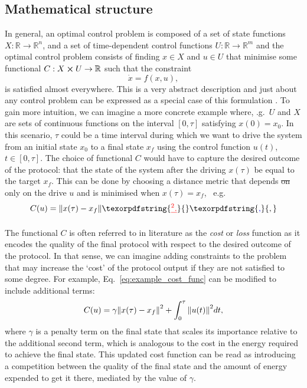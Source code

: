 \documentclass[a4paper,oneside,11pt]{book}
\newcommand{\R}{\mathbb{R}}
\providecommand{\DIFaddtex}[1]{{\protect\color{blue}\uwave{#1}}} %
\providecommand{\DIFdeltex}[1]{{\protect\color{red}\sout{#1}}}                      %
\providecommand{\DIFaddbegin}{} %
\providecommand{\DIFaddend}{} %
\providecommand{\DIFdelbegin}{} %
\providecommand{\DIFdelend}{} %
\providecommand{\DIFadd}[1]{\texorpdfstring{\DIFaddtex{#1}}{#1}} %
\providecommand{\DIFdel}[1]{\texorpdfstring{\DIFdeltex{#1}}{}} %
\newcommand{\DIFscaledelfig}{0.5}
\newlength{\DIFdelgraphicswidth} %
\newlength{\DIFdelgraphicsheight} %
\newcommand{\DIFaddincludegraphics}[2][]{{\color{blue}\fbox{\DIFOincludegraphics[#1]{#2}}}} %
\newcommand{\DIFdelincludegraphics}[2][]{%
\sbox{\DIFdelgraphicsbox}{\DIFOincludegraphics[#1]{#2}}%
\settoboxwidth{\DIFdelgraphicswidth}{\DIFdelgraphicsbox} %
\settoboxtotalheight{\DIFdelgraphicsheight}{\DIFdelgraphicsbox} %
\scalebox{\DIFscaledelfig}{%
\parbox[b]{\DIFdelgraphicswidth}{\usebox{\DIFdelgraphicsbox}\\[-\baselineskip] \rule{\DIFdelgraphicswidth}{0em}}\llap{\resizebox{\DIFdelgraphicswidth}{\DIFdelgraphicsheight}{%
\setlength{\unitlength}{\DIFdelgraphicswidth}%
\begin{picture}(1,1)%
\thicklines\linethickness{2pt} %
{\color[rgb]{1,0,0}\put(0,0){\framebox(1,1){}}}%
{\color[rgb]{1,0,0}\put(0,0){\line( 1,1){1}}}%
{\color[rgb]{1,0,0}\put(0,1){\line(1,-1){1}}}%
\end{picture}%
}\hspace*{3pt}}} %
} %
\DeclareRobustCommand{\DIFaddbegin}{\DIFOaddbegin \let\includegraphics\DIFaddincludegraphics} %
\DeclareRobustCommand{\DIFaddend}{\DIFOaddend \let\includegraphics\DIFOincludegraphics} %
\DeclareRobustCommand{\DIFdelbegin}{\DIFOdelbegin \let\includegraphics\DIFdelincludegraphics} %
\DeclareRobustCommand{\DIFdelend}{\DIFOaddend \let\includegraphics\DIFOincludegraphics} %
\begin{document}
\subsection{Mathematical structure}\label{sec:3.1.1_mathematical_structure}

In general, an optimal control problem is composed of a set of state functions $X: \R \rightarrow \R^n$, and a set of time-dependent control functions $U:\R \rightarrow \R^m$ and the optimal control problem consists of finding $x \in X$ and $u \in U$ that minimise some functional $C: X \cross U \rightarrow \R$ such that the constraint
\begin{equation}\label{eq:control_ODE}
    \dot{x} = f(x, u),
\end{equation}
is satisfied almost everywhere. This is a very abstract description and just about any control problem can be expressed as a special case of this formulation \cite{dalessandro_introduction_2021}. To gain more intuition, we can imagine a more concrete example where, \@e.g.~$U$ and $X$ are sets of continuous functions on the interval $[0, \tau]$ satisfying $x(0) = x_0$. In this scenario, $\tau$ could be a time interval during which we want to drive the system from an initial state $x_0$ to a final state $x_f$ using the control function $u(t)$, $t \in [0, \tau]$. The choice of functional $C$ would have to capture the desired outcome of the protocol: that the state of the system after the driving $x(\tau)$ be equal to the target $x_f$. This can be done by choosing a distance metric that depends \DIFdelbegin \DIFdel{on }\DIFdelend only on the drive $u$ and is minimised when $x(\tau) = x_f$, \@~e.g.
\begin{equation}\label{eq:example_cost_func}
    C(u) = \norm{x(\tau)  - x_f}\DIFdelbegin \DIFdel{^2.
}\DIFdelend \DIFaddbegin \DIFadd{,
}\DIFaddend \end{equation}
\DIFaddbegin \DIFadd{where $\norm{\cdot}$ represents some norm on the space $X$.
}

	\DIFaddend The functional $C$ is often referred to in literature as the \emph{cost} or \emph{loss} function \cite{wald_statistical_1950} as it encodes the quality of the final protocol with respect to the desired outcome of the protocol. In that sense, we can imagine adding constraints to the problem that may increase the `cost' of the protocol output if they are not satisfied to some degree. For example, Eq.~\eqref{eq:example_cost_func} can be modified to include additional terms:
\begin{equation}\label{eq:example_cost_func2}
    C(u) = \gamma \norm{x(\tau)  - x_f}^2 + \int_0^{\tau} \norm{u(t)}^2 dt,
\end{equation}
where $\gamma$ is a penalty term on the final state that scales its importance relative to the additional second term, which is analogous to the cost in the energy required to achieve the final state. This updated cost function can be read as introducing a competition between the quality of the final state and the amount of energy expended to get it there, mediated by the value of $\gamma$.
\end{document}
